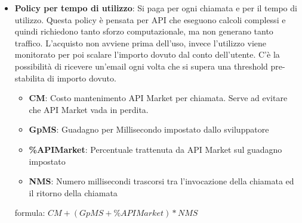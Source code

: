 \begin{itemize}
	\item \textbf{Policy per tempo di utilizzo}: Si paga per ogni chiamata e per il tempo di utilizzo.
Questa policy \`{e} pensata per API che eseguono calcoli complessi e quindi richiedono tanto sforzo computazionale, ma non generano tanto traffico. L'acquisto non avviene prima dell'uso, invece l'utilizzo viene monitorato per poi scalare l'importo dovuto dal conto dell'utente. C'\`{e} la possibilit\`{a} di ricevere un'email ogni volta che si supera una threshold pre-stabilita di importo dovuto.
	
	\begin{itemize}
		\item \textbf{CM}: Costo mantenimento API Market per chiamata. Serve ad evitare che API Market vada in perdita.
		\item \textbf{GpMS}: Guadagno per Millisecondo impostato dallo sviluppatore
		\item \textbf{\%APIMarket}: Percentuale trattenuta da API Market sul guadagno impostato
		\item \textbf{NMS}: Numero millisecondi trascorsi tra l'invocazione della chiamata ed il ritorno della chiamata
	\end{itemize}
	formula: $CM + (GpMS + \%APIMarket) * NMS
$
\end{itemize}

